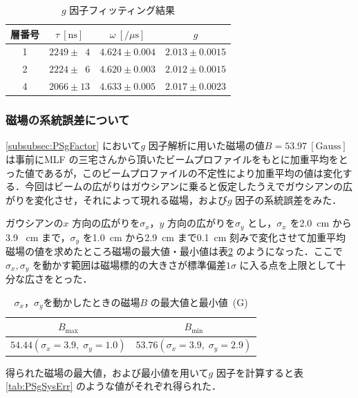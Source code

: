 \begin{table}[h]
	\centering
	\caption{$g$ 因子フィッティング結果}
	\begin{tabular}{cccc} \toprule
	層番号 & $\tau~[\mathrm{ns}]$ & $\omega~[/ \mu\mathrm{s}]$ & $g$ \\ \midrule
	1 & $2249 \pm \phantom{0}4$ & $4.624 \pm 0.004$ & $2.013 \pm 0.0015$ \\  
	2 & $2224 \pm \phantom{0}6$ & $4.620 \pm 0.003$ & $2.012 \pm 0.0015$ \\  
	4 & $2066 \pm 13$ & $4.633 \pm 0.005$ & $2.017 \pm 0.0023$ \\  \bottomrule
	\end{tabular}\label{tab:PSgFactor}
\end{table}%

\newpage

\subsubsection{磁場の系統誤差について}
\label{subsubsec:MagSysErr}
\ref{subsubsec:PSgFactor} において$g$ 因子解析に用いた磁場の値$B = 53.97~[\mathrm{Gauss}]$ は事前にMLF の三宅さんから頂いたビームプロファイルをもとに加重平均をとった値であるが，このビームプロファイルの不定性により加重平均の値は変化する．今回はビームの広がりはガウシアンに乗ると仮定したうえでガウシアンの広がりを変化させ，それによって現れる磁場，および$g$ 因子の系統誤差をみた．

ガウシアンの$x$ 方向の広がりを$\sigma_{x}$，$y$ 方向の広がりを$\sigma_{y}$ とし，$\sigma_{x}$ を2.0~cm から3.9 ~cm まで，$\sigma_{y}$ を1.0~cm から2.9~cm まで0.1~cm 刻みで変化させて加重平均磁場の値を求めたところ磁場の最大値・最小値は表\ref{tab:MagSysErr} のようになった．ここで$\sigma_{x}, \sigma_{y}$ を動かす範囲は磁場標的の大きさが標準偏差$1\sigma$ に入る点を上限として十分な広さをとった．

\begin{table}[h]
	\centering
	\caption{$\sigma_{x}$，$\sigma_{y}$を動かしたときの磁場$B$ の最大値と最小値~(G)}
	\begin{tabular}{cc}\toprule
	$B_{\mathrm{max}}$ & $B_{\mathrm{min}}$ \\ \midrule
	$54.44 (\sigma_{x} = 3.9, \;\sigma_{y} = 1.0)$ & $53.76 (\sigma_{x} = 3.9,\;\sigma_{y} = 2.9)$ \\ \bottomrule 	
	\end{tabular}\label{tab:MagSysErr}
\end{table}%

得られた磁場の最大値，および最小値を用いて$g$ 因子を計算すると表\ref{tab:PSgSysErr} のような値がそれぞれ得られた．

